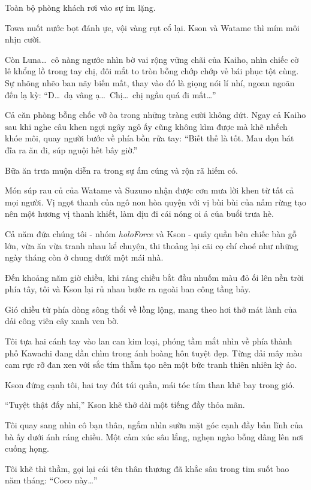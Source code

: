 \documentclass[../main.tex]{subfiles}
\begin{document}
Toàn bộ phòng khách rơi vào sự im lặng.

Towa nuốt nước bọt đánh ực, vội vàng rụt cổ lại. Kson và Watame thì mím môi nhịn cười.

Còn Luna\dots\ cô nàng ngước nhìn bờ vai rộng vững chãi của Kaiho, nhìn chiếc cờ lê khổng lồ trong tay chị, đôi mắt to tròn bỗng chớp chớp vẻ bái phục tột cùng. Sự nhõng nhẽo ban nãy biến mất, thay vào đó là giọng nói lí nhí, ngoan ngoãn đến lạ kỳ: ``D\dots\ dạ vâng ạ\dots\ Chị\dots\ chị ngầu quá đi mất\dots''

Cả căn phòng bỗng chốc vỡ òa trong những tràng cười không dứt. Ngay cả Kaiho sau khi nghe câu khen ngợi ngây ngô ấy cũng không kìm được mà khẽ nhếch khóe môi, quay người bước về phía bồn rửa tay: ``Biết thế là tốt. Mau dọn bát đĩa ra ăn đi, súp nguội hết bây giờ.''

\ct

Bữa ăn trưa muộn diễn ra trong sự ấm cúng và rộn rã hiếm có.

Món súp rau củ của Watame và Suzuno nhận được cơn mưa lời khen từ tất cả mọi người. Vị ngọt thanh của ngô non hòa quyện với vị bùi bùi của nấm rừng tạo nên một hương vị thanh khiết, làm dịu đi cái nóng oi ả của buổi trưa hè.

Cả năm đứa chúng tôi - nhóm \textit{holoForce} và Kson - quây quần bên chiếc bàn gỗ lớn, vừa ăn vừa tranh nhau kể chuyện, thi thoảng lại cãi cọ chí choé như những ngày tháng còn ở chung dưới một mái nhà.

Đến khoảng năm giờ chiều, khi ráng chiều bắt đầu nhuốm màu đỏ ối lên nền trời phía tây, tôi và Kson lại rủ nhau bước ra ngoài ban công tầng bảy.

Gió chiều từ phía dòng sông thổi về lồng lộng, mang theo hơi thở mát lành của dải công viên cây xanh ven bờ.

Tôi tựa hai cánh tay vào lan can kim loại, phóng tầm mắt nhìn về phía thành phố Kawachi đang dần chìm trong ánh hoàng hôn tuyệt đẹp. Từng dải mây màu cam rực rỡ đan xen với sắc tím thẫm tạo nên một bức tranh thiên nhiên kỳ ảo.

Kson đứng cạnh tôi, hai tay đút túi quần, mái tóc tím than khẽ bay trong gió.

``Tuyệt thật đấy nhỉ,'' Kson khẽ thở dài một tiếng đầy thỏa mãn.

Tôi quay sang nhìn cô bạn thân, ngắm nhìn sườn mặt góc cạnh đầy bản lĩnh của bà ấy dưới ánh ráng chiều. Một cảm xúc sâu lắng, nghẹn ngào bỗng dâng lên nơi cuống họng.

Tôi khẽ thì thầm, gọi lại cái tên thân thương đã khắc sâu trong tim suốt bao năm tháng: ``Coco này\dots''
\end{document}

